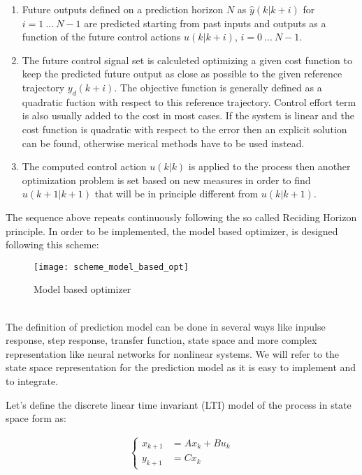 \begin{enumerate}
\item Future outputs defined on a prediction horizon $N$ as $\hat{y}(k|k+i)$ for $i=1\ ...\ N-1$ are predicted starting from past inputs and outputs as a function of the future control actions $u(k|k+i)$, $i=0\ ...\ N-1$.
\item The future control signal set is calculeted optimizing a given cost function to keep the predicted future output as close as possible to the given reference trajectory $y_d(k+i)$. The objective function is generally defined as a quadratic fuction with respect to this reference trajectory. Control effort term is also usually added to the cost in most cases. If the system is linear and the cost function is quadratic with respect to the error then an explicit solution can be found, otherwise merical methods have to be used instead.
\item The computed control action $u(k|k)$ is applied to the process then another optimization problem is set based on new measures in order to find $u(k+1|k+1)$ that will be in principle different from $u(k|k+1)$. 
\end{enumerate}
The sequence above repeats continuously following the so called Reciding Horizon principle. In order to be implemented, the model based optimizer, is designed following this scheme: \\
\begin{figure}[h!]
	\centering
	\texttt{[image: scheme\_model\_based\_opt]}
	\caption{Model based optimizer}
	\label{scheme_model_based_opt}
\end{figure}
\\
The definition of prediction model can be done in several ways like inpulse response, step response, transfer function, state space and more complex representation like neural networks for nonlinear systems. We will refer to the state space representation for the prediction model as it is easy to implement and to integrate.

Let's define the discrete linear time invariant (LTI) model of the process in state space form as:

\begin{equation} \label{system_evolution}
	\begin{split}
		\begin{cases}
			x_{k+1}&=Ax_k+Bu_k \\
			y_{k+1}&=Cx_k
		\end{cases}
	\end{split}
\end{equation}

